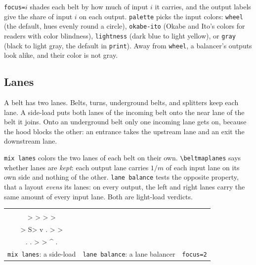 \documentclass[11pt]{article}
\newcommand\cs[1]{\texttt{\textbackslash#1}}
\newcommand\key[1]{\texttt{#1}}
\newenvironment{pictures}[1]{\tagpdfsetup{table/tagging=presentation}\begin{tabular}{#1}}{\end{tabular}}
\begin{document}
	\key{focus=$i$} shades each belt by how much of input $i$ it carries, and the output labels give the share of input $i$ on each output. \key{palette} picks the input colors: \key{wheel} (the default, hues evenly round a circle), \key{okabe-ito} (Okabe and Ito's colors for readers with color blindness), \key{lightness} (dark blue to light yellow), or \key{gray} (black to light gray, the default in \key{print}). Away from \key{wheel}, a balancer's outputs look alike, and their color is not gray.

	\subsection{Lanes}
	\label{sec:lanes}

	A belt has two lanes. Belts, turns, underground belts, and splitters keep each lane. A side-load puts both lanes of the incoming belt onto the near lane of the belt it joins. Onto an underground belt only one incoming lane gets on, because the hood blocks the other: an entrance takes the upstream lane and an exit the downstream lane.

	\key{mix lanes} colors the two lanes of each belt on their own. \cs{beltmaplanes} says whether lanes are \emph{kept}: each output lane carries $1/m$ of each input lane on its own side and nothing of the other. \key{lane balance} tests the opposite property, that a layout \emph{evens} its lanes: on every output, the left and right lanes carry the same amount of every input lane. Both are light-load verdicts.

	\begin{center}
		\begin{pictures}{@{}c@{\qquad}c@{\qquad}c@{}}
			\begin{beltgrid}[mix, mix lanes, tile=7mm, labels]
				. v . . \\
				> > > >
			\end{beltgrid}
			&
			\begin{beltgrid}[mix, mix lanes, lane balance, tile=6mm, expect=lane-balanced]
				. S> > > v . \\
				> S> v . > > \\
				. . > > ^ .
			\end{beltgrid}
			&
			\beltlayout[focus=2, labels, tile=3.2mm]{examples/f00_9x10.json}
			\\
			\small\key{mix lanes}: a side-load & \small\key{lane balance}: a lane balancer & \small\key{focus=2}
		\end{pictures}
	\end{center}
\end{document}
